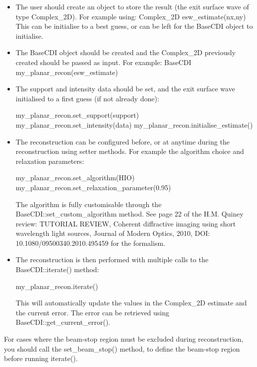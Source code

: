 \documentclass[]{nadia}
\begin{document}
\begin{itemize}

  \item The user should create an object to store the result (the exit
    surface wave of type Complex\_2D). For example using: Complex\_2D
    esw\_estimate(nx,ny) This can be initialise to a best guess, or can
    be left for the BaseCDI object to initialise.

  \item The BaseCDI object should be created and the Complex\_2D
    previously created should be passed as input. For example: BaseCDI
    my\_planar\_recon(esw\_estimate)

  \item The support and intensity data should be set, and the exit
    surface wave initialised to a first guess (if not already done):
    \begin{myverbatim}
    my_planar_recon.set_support(support) 
    my_planar_recon.set_intensity(data) 
    my_planar_recon.initialise_estimate()
    \end{myverbatim}

  \item The reconstruction can be configured before, or at anytime
    during the reconstruction using setter methods. For example the
    algorithm choice and relaxation parameters:
    \begin{myverbatim}
    my_planar_recon.set_algorithm(HIO) 
    my_planar_recon.set_relaxation_parameter(0.95) 
    \end{myverbatim}
    The algorithm is fully customisable through the
    BaseCDI::set\_custom\_algorithm method. See page 22 of the H.M. Quiney
    review: TUTORIAL REVIEW, Coherent diffractive imaging using short
    wavelength light sources, Journal of Modern Optics, 2010, DOI:
    10.1080/09500340.2010.495459 for the formalism.

  \item The reconstruction is then performed with multiple calls to the
    BaseCDI::iterate() method:
    \begin{myverbatim}
    my_planar_recon.iterate() 
    \end{myverbatim}
    This will automatically update the values in the Complex\_2D estimate
    and the current error. The error can be retrieved using
    BaseCDI::get\_current\_error().
\end{itemize}

For cases where the beam-stop region must be excluded during
reconstruction, you should call the set\_beam\_stop() method, to define
the beam-stop region before running iterate().
\end{document}
